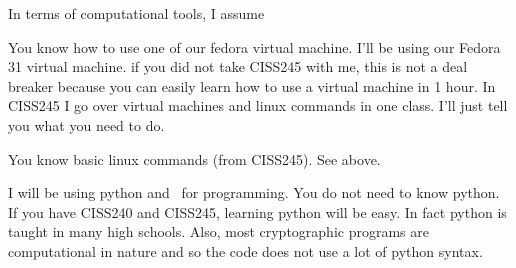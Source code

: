 In terms of computational tools, I assume
\begin{itemize}
  
  \li You know how to use one of our fedora virtual machine.
  I'll be using our Fedora 31 virtual machine.
  if you did not take CISS245 with me, this is not a deal breaker
  because you can easily learn how to use a virtual machine in 1 hour.
  In CISS245 I go over virtual machines and linux commands
  in one class.
  I'll just tell you what you need to do.
  
  \li You know basic linux commands (from CISS245).
  See above.
  
  \li I will be using python and \cpp\ for programming. You do not need to know
  python. If you have CISS240 and CISS245, learning python will be easy.
  In fact python is taught in many high schools.
  Also, most cryptographic programs are computational in nature
  and so the code does not use a lot of python syntax.
  
\end{itemize}

%
%
%
%  

